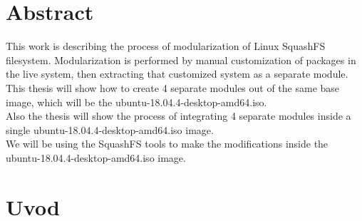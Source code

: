 \documentclass[12pt,vi]{mitthesis}
\begin{document}
\chapter*{Abstract}
\indent
This work is describing the process of modularization of Linux SquashFS filesystem. Modularization is performed by manual customization of packages in the live system, then extracting that customized system as a separate module.\\
\indent
This thesis will show how to create 4 separate modules out of the same base image, which will be the ubuntu-18.04.4-desktop-amd64.iso.\\
\indent
Also the thesis will show the process of integrating 4 separate modules inside a single ubuntu-18.04.4-desktop-amd64.iso image.\\
\indent
We will be using the SquashFS tools to make the modifications inside the ubuntu-18.04.4-desktop-amd64.iso image.

\chapter*{Uvod}
\end{document}
